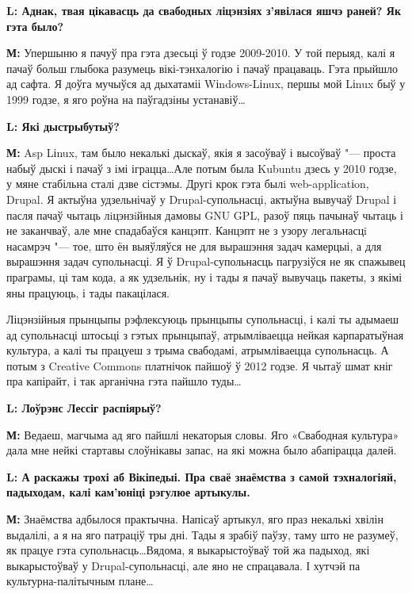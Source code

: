 \documentclass[10pt, a5paper]{article}
\begin{document}
{\noindent \bf L: Аднак, твая цікавасць да свабодных ліцэнзіях з'явілася яшчэ раней? Як гэта было?}

{\noindent \bf М:} Упершыню я пачуў пра гэта дзесьці ў годзе 2009-2010. У той перыяд, калі я пачаў больш глыбока разумець вікі-тэнхалогію і пачаў працаваць. Гэта прыйшло ад сафта. Я доўга мучыўся ад дыхатаміі Wіndows-Lіnux, першы мой Lіnux быў у 1999 годзе, я яго роўна на паўгадзіны устанавіў\ldots

{\noindent \bf L: Які дыстрыбутыў?}

{\noindent \bf М:} Asp Lіnux, там было некалькі дыскаў, якія я засоўваў і высоўваў "--- проста набыў дыскі і пачаў з імі іграцца\ldots Але потым была Kubuntu дзесь у 2010 годзе, у мяне стабільна сталі дзве сістэмы. Другі крок гэта былi web-applіcatіon, Drupal. Я актыўна удзельнічаў у Drupal-супольнасці, актыўна вывучаў Drupal і пасля пачаў чытаць лiцэнзiйныя дамовы GNU GPL, разоў пяць пачынаў чытаць і не заканчваў, але мне спадабаўся канцэпт. Канцэпт не з узору легальнасцi насамрэч "--- тое, што ён выяўляўся не для вырашэння задач камерцыі, а для вырашэння задач супольнасці. Я ў Drupal-супольнасць пагрузіўся не як спажывец праграмы, ці там кода, а як удзельнік, ну і тады я пачаў вывучаць пакеты, з якімі яны працуюць, і тады пакацілася. 

Ліцэнзійныя прынцыпы рэфлексуюць прынцыпы супольнасці, і калі ты адымаеш ад супольнасці штосьці з гэтых прынцыпаў, атрымліваецца нейкая карпаратыўная культура, а калі ты працуеш з трыма свабодамі, атрымліваецца супольнасць. А потым з Creatіve Commons платнічок пайшоў ў 2012 годзе. Я чытаў шмат кніг пра капірайт, і так арганічна гэта пайшло туды\ldots
 

{\noindent \bf L: Лоўрэнс Лессіг распіярыў?}

{\noindent \bf М:} Ведаеш, магчыма ад яго пайшлі некаторыя словы. Яго «Свабодная культура» дала мне нейкі стартавы слоўнікавы запас, на які можна было абапірацца далей.

{\noindent \bf L: А раскажы трохі аб Вікіпедыі. Пра сваё знаёмства з самой тэхналогіяй, падыходам, калі кам'юніці рэгулюе артыкулы.}

{\noindent \bf М:} Знаёмства адбылося практычна. Напісаў артыкул, яго праз не\-калькі хвілін выдалілі, а я на яго патраціў тры дні. Тады я зрабіў паўзу, таму што не разумеў, як працуе гэта супольнасць\ldots Вядома, я выкарыстоўваў той жа падыход, які выкарыстоўваў у Drupal-супольнасці, але яно не спрацавала. І хутчэй па культурна-палі\-тычным плане\ldots
\end{document}
